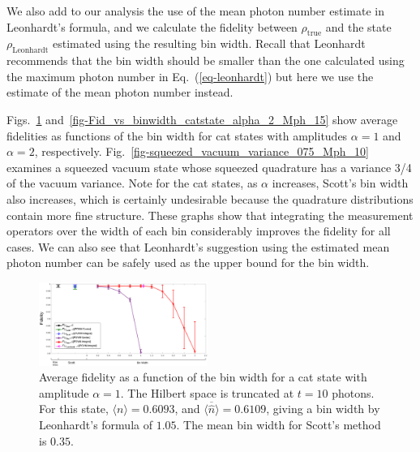 \documentclass[
reprint,
superscriptaddress,
showpacs,
amsmath,
amssymb,
aps,
pra,
longbibliography
]{revtex4-1}
\newcommand{\rhotrue}{\rho_{\text{true}}}
\begin{document}
We also add to our analysis the use of the mean photon number estimate
in Leonhardt's formula, and we calculate the fidelity between
$\rhotrue$ and the state $\rho_{\mathrm{Leonhardt}}$ estimated using
the resulting bin width. Recall that Leonhardt recommends that the bin
width should be smaller than the one calculated using the maximum photon 
number in Eq.~(\ref{eq-leonhardt}) but here we use the estimate of 
the mean photon number instead.

Figs.~\ref{fig-Fidelity_vs_binwidth_catstate_Mph_10_alpha_1}
and~\ref{fig-Fid_vs_binwidth_catstate_alpha_2_Mph_15} show average
fidelities as functions of the bin width for cat states with
amplitudes $\alpha=1$ and $\alpha=2$,
respectively. Fig.~\ref{fig-squeezed_vacuum_variance_075_Mph_10}
  examines a squeezed vacuum state whose squeezed quadrature has a
  variance 3/4 of the vacuum variance.  Note for the cat states, as
  $\alpha$ increases, Scott's bin width also increases, which is
  certainly undesirable because the quadrature distributions contain
  more fine structure.  These graphs show that integrating the
  measurement operators over the width of each bin considerably
  improves the fidelity for all cases. We can also see that
  Leonhardt's suggestion using the estimated mean photon number can be
  safely used as the upper bound for the bin width.

\begin{figure}
  \includegraphics[width=0.49\textwidth]{catstate-alpha=1-10photons.eps}
  \caption{Average fidelity as a function of the bin width for a cat
    state with amplitude $\alpha = 1$. The Hilbert space is truncated
    at $t=10$ photons. For this state, $\langle n \rangle = 0.6093$, and 
    $\overline{\langle \hat{n} \rangle}=0.6109$, giving a bin width by
    Leonhardt's formula of $1.05$. The mean bin width for Scott's method 
    is $0.35$.}
  \label{fig-Fidelity_vs_binwidth_catstate_Mph_10_alpha_1}
\end{figure}
\end{document}
